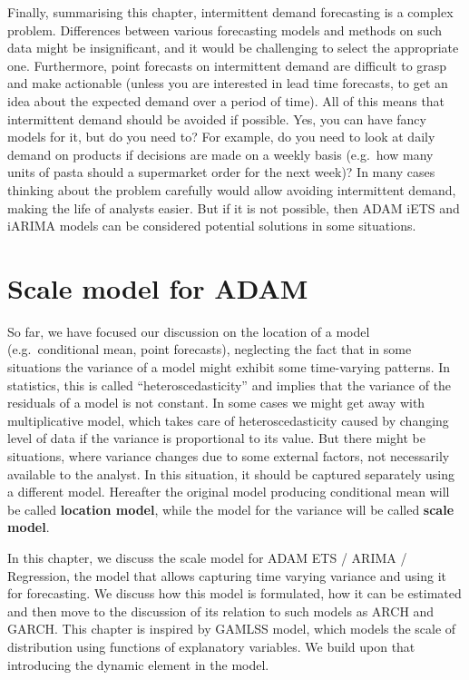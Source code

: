\documentclass[
]{book}
\theoremstyle{definition}
\theoremstyle{definition}
\theoremstyle{definition}
\theoremstyle{definition}
\theoremstyle{remark}
\begin{document}
Finally, summarising this chapter, intermittent demand forecasting is a complex problem. Differences between various forecasting models and methods on such data might be insignificant, and it would be challenging to select the appropriate one. Furthermore, point forecasts on intermittent demand are difficult to grasp and make actionable (unless you are interested in lead time forecasts, to get an idea about the expected demand over a period of time). All of this means that intermittent demand should be avoided if possible. Yes, you can have fancy models for it, but do you need to? For example, do you need to look at daily demand on products if decisions are made on a weekly basis (e.g.~how many units of pasta should a supermarket order for the next week)? In many cases thinking about the problem carefully would allow avoiding intermittent demand, making the life of analysts easier. But if it is not possible, then ADAM iETS and iARIMA models can be considered potential solutions in some situations.

\hypertarget{ADAMscaleModel}{%
\chapter{Scale model for ADAM}\label{ADAMscaleModel}}

So far, we have focused our discussion on the location of a model (e.g.~conditional mean, point forecasts), neglecting the fact that in some situations the variance of a model might exhibit some time-varying patterns. In statistics, this is called ``heteroscedasticity'' and implies that the variance of the residuals of a model is not constant. In some cases we might get away with multiplicative model, which takes care of heteroscedasticity caused by changing level of data if the variance is proportional to its value. But there might be situations, where variance changes due to some external factors, not necessarily available to the analyst. In this situation, it should be captured separately using a different model. Hereafter the original model producing conditional mean will be called \textbf{location model}, while the model for the variance will be called \textbf{scale model}.

In this chapter, we discuss the scale model for ADAM ETS / ARIMA / Regression, the model that allows capturing time varying variance and using it for forecasting. We discuss how this model is formulated, how it can be estimated and then move to the discussion of its relation to such models as ARCH and GARCH. This chapter is inspired by GAMLSS model, which models the scale of distribution using functions of explanatory variables. We build upon that introducing the dynamic element in the model.
\end{document}
